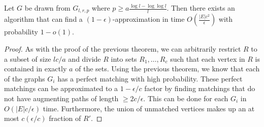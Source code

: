 \begin{thm}
Let $G$ be drawn from $G_{l,r,p}$ where $p \geq a\frac{\log l - \log\log l}{l}$. Then there
exists an algorithm that can find a $(1-\epsilon)$-approximation in time
$O(\frac{|E|c^2}{\epsilon})$ with probability $1-o(1)$.
\end{thm}
\begin{proof}
As with the proof of the previous theorem, we can arbitrarily restrict $R$ to a
subset of size $lc/a$ and divide $R$ into sets $R_1,\ldots,R_c$ such that each
vertex in $R$ is contained in exactly $a$ of the sets. Using the previous
theorem, we know that each of the graphs $G_i$ has a perfect matching with high
probability. These perfect matchings can be approximated to a $1-\epsilon/c$
factor by finding matchings that do not have augmenting paths of length
$\geq 2c/\epsilon$. This can be done for each $G_i$ in $O(|E|c/\epsilon)$ time.
Furthermore, the union of unmatched vertices makes up an at most
$c(\epsilon/c)$ fraction of $R'$.
\end{proof}

